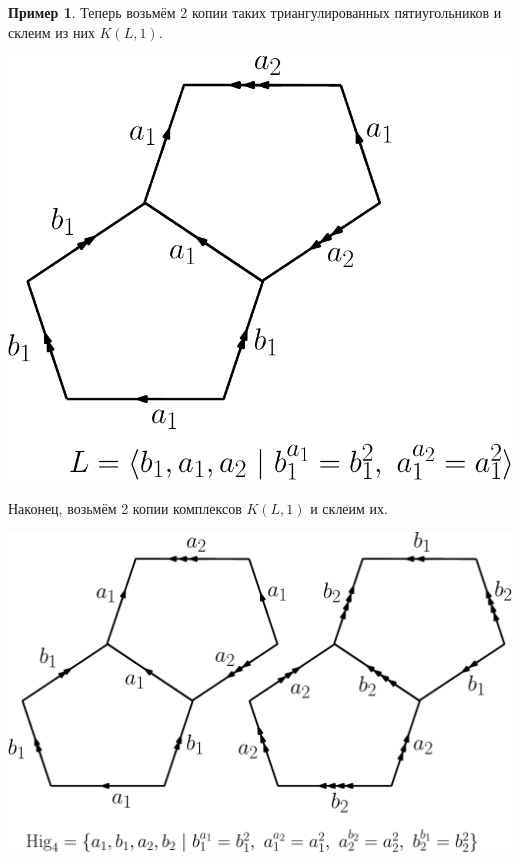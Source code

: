 \documentclass[14pt, dvipsnames, twoside]{extarticle}
\theoremstyle{definition}
\newtheorem{example}{Пример}
\theoremstyle{remark}
\begin{document}
\begin{example}
Теперь возьмём 2 копии таких триангулированных пятиугольников и склеим из них $K(L, 1)$.


\begin{center}
\includegraphics[scale=0.6]{L}
\end{center}


Наконец, возьмём 2 копии комплексов $K(L, 1)$ и склеим их.


\begin{center}
\includegraphics[scale=0.6]{Hig4}
\end{center}












\end{example} 
\end{document}
